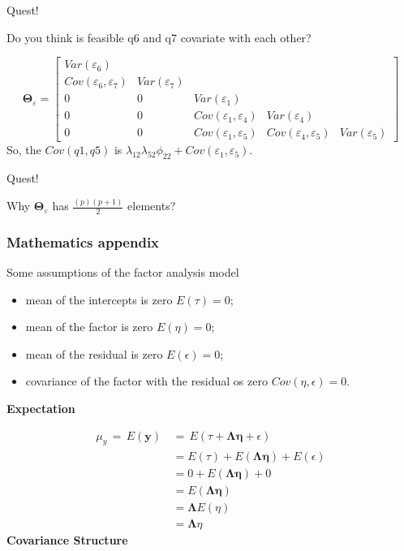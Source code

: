 \documentclass[
]{article}
\begin{document}
Quest!

Do you think is feasible q6 and q7 covariate with each other?

\[
\mathbf{\Theta}_{\varepsilon}=
\begin{bmatrix}
Var(\varepsilon_{6}) & & & &\\
Cov(\varepsilon_{6},\varepsilon_{7}) & Var(\varepsilon_{7}) & \\
0 & 0 & Var(\varepsilon_{1})& \\
0 & 0 & Cov(\varepsilon_{1},\varepsilon_{4})  & Var(\varepsilon_{4})\\
0 & 0 & Cov(\varepsilon_{1},\varepsilon_{5})  & Cov(\varepsilon_{4},\varepsilon_{5})  & Var(\varepsilon_{5})
\end{bmatrix}
\] So, the \(Cov(q1,q5)\) is
\(\lambda_{12} \lambda_{52}\phi_{22}+Cov(\varepsilon_{1},\varepsilon_{5})\).

Quest!

Why \(\mathbf{\Theta}_{\varepsilon}\) has \(\frac{(p)(p+1)}{2}\)
elements?

\hypertarget{mathematics-appendix}{%
\subsubsection{Mathematics appendix}\label{mathematics-appendix}}

Some assumptions of the factor analysis model

\begin{itemize}
\item
  mean of the intercepts is zero \(E(\tau)=0\);
\item
  mean of the factor is zero \(E(\eta)=0\);
\item
  mean of the residual is zero \(E(\epsilon)=0\);
\item
  covariance of the factor with the residual os zero
  \(Cov(\eta,\epsilon)=0\).
\end{itemize}

\textbf{Expectation}

\[
\begin{align}
\mu_{y} \, = \, E(\mathbf{y})\, & = \,E(\tau+\mathbf{\Lambda\eta}+\epsilon)\\
& =E(\tau)+E(\mathbf{\Lambda\eta})+E(\epsilon)\\
& =0+E(\mathbf{\Lambda\eta})+0\\
& =E(\mathbf{\Lambda\eta})\\
& =\mathbf{\Lambda}E(\eta)\\
& =\mathbf{\Lambda}\eta
\end{align}
\] \textbf{Covariance Structure}
\end{document}
